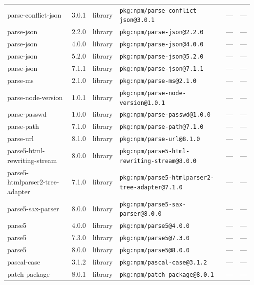\documentclass[11pt,a4paper]{article}
\begin{document}
\begin{longtable}{|p{4cm}|p{2cm}|p{1.6cm}|p{5cm}|p{1.5cm}|p{3.5cm}|}
\raggedright parse-conflict-json & 3.0.1 & library & \small\texttt{pkg:npm/parse-conflict-json@3.0.1} & — & \small — \\
\raggedright parse-json & 2.2.0 & library & \small\texttt{pkg:npm/parse-json@2.2.0} & — & \small — \\
\raggedright parse-json & 4.0.0 & library & \small\texttt{pkg:npm/parse-json@4.0.0} & — & \small — \\
\raggedright parse-json & 5.2.0 & library & \small\texttt{pkg:npm/parse-json@5.2.0} & — & \small — \\
\raggedright parse-json & 7.1.1 & library & \small\texttt{pkg:npm/parse-json@7.1.1} & — & \small — \\
\raggedright parse-ms & 2.1.0 & library & \small\texttt{pkg:npm/parse-ms@2.1.0} & — & \small — \\
\raggedright parse-node-version & 1.0.1 & library & \small\texttt{pkg:npm/parse-node-version@1.0.1} & — & \small — \\
\raggedright parse-passwd & 1.0.0 & library & \small\texttt{pkg:npm/parse-passwd@1.0.0} & — & \small — \\
\raggedright parse-path & 7.1.0 & library & \small\texttt{pkg:npm/parse-path@7.1.0} & — & \small — \\
\raggedright parse-url & 8.1.0 & library & \small\texttt{pkg:npm/parse-url@8.1.0} & — & \small — \\
\raggedright parse5-html-rewriting-stream & 8.0.0 & library & \small\texttt{pkg:npm/parse5-html-rewriting-stream@8.0.0} & — & \small — \\
\raggedright parse5-htmlparser2-tree-adapter & 7.1.0 & library & \small\texttt{pkg:npm/parse5-htmlparser2-tree-adapter@7.1.0} & — & \small — \\
\raggedright parse5-sax-parser & 8.0.0 & library & \small\texttt{pkg:npm/parse5-sax-parser@8.0.0} & — & \small — \\
\raggedright parse5 & 4.0.0 & library & \small\texttt{pkg:npm/parse5@4.0.0} & — & \small — \\
\raggedright parse5 & 7.3.0 & library & \small\texttt{pkg:npm/parse5@7.3.0} & — & \small — \\
\raggedright parse5 & 8.0.0 & library & \small\texttt{pkg:npm/parse5@8.0.0} & — & \small — \\
\raggedright pascal-case & 3.1.2 & library & \small\texttt{pkg:npm/pascal-case@3.1.2} & — & \small — \\
\raggedright patch-package & 8.0.1 & library & \small\texttt{pkg:npm/patch-package@8.0.1} & — & \small — \\

\end{longtable}
\end{document}
